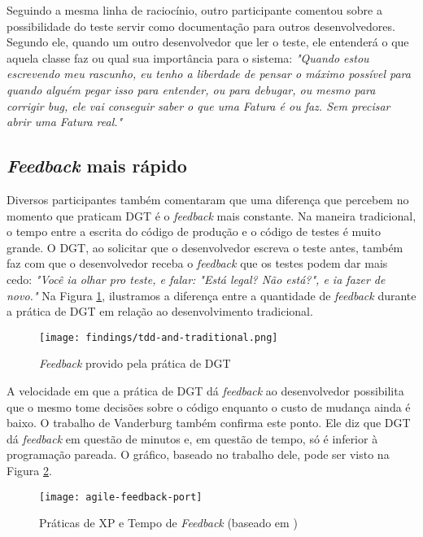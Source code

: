 Seguindo a mesma linha de raciocínio, outro participante comentou sobre a possibilidade
do teste servir como documentação para outros desenvolvedores. Segundo ele, quando um outro desenvolvedor
que ler o teste, ele entenderá o que aquela classe faz ou qual sua importância para o sistema:
\textit{"Quando estou escrevendo meu rascunho, eu tenho a liberdade de pensar o máximo possível para quando alguém
pegar isso para entender, ou para debugar, ou mesmo para corrigir bug, ele vai conseguir saber o que uma Fatura é ou faz. Sem
precisar abrir uma Fatura real."}

\subsection{\textit{Feedback} mais rápido}

Diversos participantes também comentaram que uma diferença que percebem
no momento que praticam DGT é o \textit{feedback} mais constante. Na maneira
tradicional, o tempo entre a escrita do código de produção e o código
de testes é muito grande. O DGT, ao solicitar que o desenvolvedor
escreva o teste antes, também faz com que o desenvolvedor receba o \textit{feedback} que
os testes podem dar mais cedo:
\textit{"Você ia olhar pro teste, e falar: "Está legal? Não está?", e ia fazer de novo."}
Na Figura \ref{fig:tdd-feedback}, ilustramos
a diferença entre a quantidade de \textit{feedback} durante a prática de DGT em relação
ao desenvolvimento tradicional.

\begin{figure}[h!H]
  \centering
  \texttt{[image: findings/tdd-and-traditional.png]}
  \caption{\textit{Feedback} provido pela prática de DGT}
  \label{fig:tdd-feedback}
\end{figure}

A velocidade em que a prática de DGT dá \textit{feedback} ao desenvolvedor possibilita que o mesmo
tome decisões sobre o código enquanto o custo de mudança ainda é
baixo. O trabalho de Vanderburg \cite{vanderburg} também confirma este ponto.
Ele diz que DGT dá \textit{feedback} em questão de
minutos e, em questão de tempo, só é inferior à programação pareada. O gráfico,
baseado no trabalho dele, pode ser visto na Figura
\ref{fig:agile-feedback}.

\begin{figure}
  \centering
  \texttt{[image: agile-feedback-port]}
  \caption{Práticas de XP e Tempo de \textit{Feedback} (baseado em \cite{vanderburg})}
  \label{fig:agile-feedback}
\end{figure}

